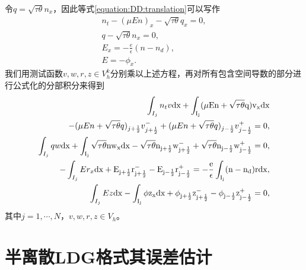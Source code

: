 令$q = \sqrt{\tau \theta }n_x$，因此等式\eqref{equation:DD:translation}可以写作
\begin{align}
    n_t - (\mu E n)_x - \sqrt{\tau \theta}q_x = 0, \\
    q - \sqrt{\tau \theta}n_x = 0,                 \\
    E_x = -\frac{e}{\epsilon}(n - n_d),            \\
    E = - \phi_x.
\end{align}
我们用测试函数$v,w,r,z \in V_h^k$分别乘以上述方程，再对所有包含空间导数的部分进行公式化的分部积分来得到
\begin{align}
    \int_{I_j} n_t v \rm{d}x + \int_{I_j}(\mu En + \sqrt{\tau \theta}q)v_x\rm{d} x          \nonumber                                                                                                                         \\
    - (\mu En + \sqrt{\tau \theta}q)_{j+\frac{1}{2}}v_{j+\frac{1}{2}}^- +(\mu En + \sqrt{\tau \theta}q)_{j-\frac{1}{2}}v_{j-\frac{1}{2}}^+ = 0, \label{weakForm:1:translation}                                                \\
    \int_{I_j} qw\rm{d}x + \int_{I_j}\sqrt{\tau \theta} n w_x \rm{d}x - \sqrt{\tau \theta} n_{j+\frac{1}{2}}w_{j+\frac{1}{2}}^- + \sqrt{\tau \theta} n_{j-\frac{1}{2}}w_{j-\frac{1}{2}}^+ = 0, \label{weakForm:2:translation} \\
    -\int_{I_j}Er_x\rm{d}x + E_{j+\frac{1}{2}}r_{j+\frac{1}{2}}^- - E_{j-\frac{1}{2}}r_{j-\frac{1}{2}}^+ = -\frac{e}{\epsilon}\int_{I_j}(n-n_d)r\rm{d}x,                                       \label{weakForm:3:translation} \\
    \int_{I_j} Ez \rm{d}x - \int_{I_j}\phi z_x \rm{d}x + \phi_{j+\frac{1}{2}}z_{j+\frac{1}{2}}^- - \phi_{j-\frac{1}{2}}z_{j-\frac{1}{2}}^+ = 0,\label{weakForm:4:translation}
\end{align}
其中$ j=1,\cdots,N$，$v,w,r,z \in V_h$。

\section{半离散LDG格式其误差估计}
